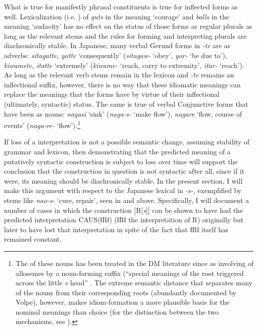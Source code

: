 \documentclass[output=paper,
modfonts
]{LSP/langsci}
\begin{document}
What is true for manifestly phrasal constituents is true for inflected
forms as well. Lexicalization (i.e. ) of \textit{guts} in
the meaning `courage' and \textit{balls} in the meaning `audacity' has no
effect on the status of those forms as regular plurals as long as the
relevant stems and the rules for forming and interpreting plurals are
diachronically stable. In Japanese, many verbal Gerund forms in
\textit{\nobreakdash-te} are  as adverbs: \textit{sitagatte, yotte}
`consequently' (\textit{sitagaw-} `obey', \textit{yor-} `be due to'),
\textit{kiwamete, itatte} `extremely' (\textit{kiwame-} `reach, carry to
extremity', \textit{itar-} `reach'). As long as the relevant verb stems
remain in the lexicon and \textit{-te} remains an inflectional suffix,
however, there is no way that these idiomatic meanings can replace the
 meanings that the forms have by virtue of their
inflectional (ultimately, syntactic) status. The same is true of verbal
Conjunctive forms that have been  as nouns: \textit{nagasi}
`sink' (\textit{naga-s-} `make flow'), \textit{nagare} `flow, course of
events' (\textit{naga-re-} `flow').\footnote{The  of these nouns
  has been treated in the DM literature since \citet{volpe2005a} as involving
   of  allosemes by a noun-forming suffix (``special
  meanings of the root triggered across the little \textit{v} head'' \citep[107]{marantz2013a}. The extreme semantic distance that separates many of the nouns from their corresponding roots (abundantly documented by
  Volpe), however, makes idiom-formation a more plausible basis for the
  nominal meanings than  choice (for the distinction between the
  two mechanisms, see \citealt[105]{marantz2013a}).}

If loss of a  interpretation is not a possible semantic
change, assuming stability of grammar and lexicon, then demonstrating
that the predicted  meaning of a putatively syntactic
construction is subject to loss over time will support the conclusion
that the construction in question is not syntactic after all, since if
it were, its  meaning should be diachronically stable. In
the present section, I will make this argument with respect to the
Japanese lexical  in \textit{-s-,} exemplified by stems like
\textit{nao-s-} `cure, repair', seen in  and  above.
Specifically, I will document a number of cases in which the
construction {[}R{[}\textit{s}{]}{]} can be shown to have had the predicted
interpretation CAUS(ǁRǁ) (ǁRǁ the interpretation of R) originally but
later to have lost that interpretation in spite of the fact that ǁRǁ
itself has remained constant.
\end{document}

